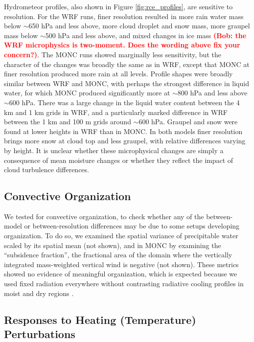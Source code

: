 \documentclass[draft]{agujournal2019}
\newcommand{\todo}[1]{\textcolor{red}{\textbf{(#1)}}}
\begin{document}
Hydrometeor profiles, also shown in Figure \ref{fig:rce_profiles}, are sensitive
to resolution. For the WRF runs, finer resolution resulted in more rain water
mass below $\sim$650 hPa and less above, more cloud droplet and snow mass, more
graupel mass below $\sim$500 hPa and less above, and mixed changes in ice mass
\todo{Bob: the WRF microphysics is two-moment. Does the wording above fix your
concern?}. The MONC runs showed marginally less sensitivity, but the character
of the changes was broadly the same as in WRF, except that MONC at finer
resolution produced more rain at all levels. Profile shapes were broadly similar
between WRF and MONC, with perhaps the strongest difference in liquid water, for
which MONC produced significantly more at $\sim$800 hPa and less above $\sim$600
hPa. There was a large change in the liquid water content between the 4 km and 1
km grids in WRF, and a particularly marked difference in WRF between the 1 km
and 100 m grids around $\sim$600 hPa. Graupel and snow were found at lower
heights in WRF than in MONC. In both models finer resolution brings more snow at
cloud top and less graupel, with relative differences varying by height. It is
unclear whether these microphysical changes are simply a consequence of mean
moisture changes or whether they reflect the impact of cloud turbulence
differences.

\subsection{Convective Organization}

We tested for convective organization, to check whether any of the between-model
or between-resolution differences may be due to some setups developing
organization. To do so, we examined the spatial variance of precipitable water
scaled by its spatial mean (not shown), and in MONC by examining the
``subsidence fraction'', the fractional area of the domain where the vertically
integrated mass-weighted vertical wind is negative (not shown). These metrics
showed no evidence of meaningful organization, which is expected because we used
fixed radiation everywhere without contrasting radiative cooling profiles in
moist and dry regions \cite{Muller_GRL_2015}.

\subsection{Responses to Heating (Temperature) Perturbations}
\end{document}

